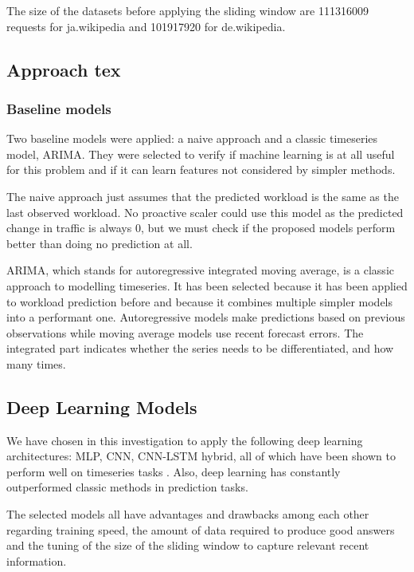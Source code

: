 \documentclass[12pt]{article}
\begin{document}
The size of the datasets before applying the sliding window are 111316009 requests for ja.wikipedia and 101917920 for de.wikipedia.


\subsection{Approach tex}
\subsubsection{Baseline models}
Two baseline models were applied: a naive approach and a classic timeseries model, ARIMA.
They were selected to verify if machine learning is at all useful for this problem
and if it can learn features not considered by simpler methods.

The naive approach just assumes that the predicted workload is the same 
as the last observed workload. No proactive scaler could use this model 
as the predicted change in traffic is always 0, but we must check if the 
proposed models perform better than doing no prediction at all.

ARIMA\cite{arima}, which stands for autoregressive integrated moving average, is a classic approach
to modelling timeseries. It has been selected because it has been applied to 
workload prediction before\cite{arima_prediction} and because it combines 
multiple simpler models into a performant one. Autoregressive models
make predictions based on previous observations while moving average models 
use recent forecast errors. The integrated part indicates whether the 
series needs to be differentiated, and how many times.


\subsection{Deep Learning Models}

We have chosen in this investigation to apply the following deep learning architectures: MLP, CNN, CNN-LSTM hybrid, all of which have been shown to perform well on timeseries tasks \cite{dl_ts}\cite{dlts_book}\cite{cnn_lstm}. Also, deep learning has constantly outperformed classic methods in prediction tasks\cite{dlrev}. 

The selected models all have advantages and drawbacks among each other regarding training speed, the amount of data required to produce good answers and the tuning of the size of the sliding window to capture relevant recent information.
\end{document}
